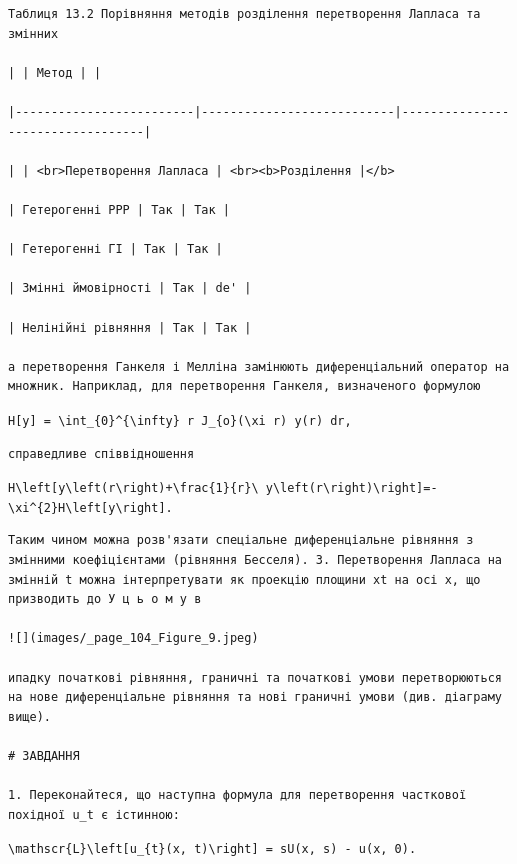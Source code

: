 \documentclass[
  ukrainian,
]{article}
\begin{document}
\begin{verbatim}
Таблиця 13.2 Порівняння методів розділення перетворення Лапласа та змінних

| | Метод | |

|-------------------------|---------------------------|----------------------------------|

| | <br>Перетворення Лапласа | <br><b>Розділення |</b>

| Гетерогенні PPP | Так | Так |

| Гетерогенні ГІ | Так | Так |

| Змінні ймовірності | Так | de' |

| Нелінійні рівняння | Так | Так |

а перетворення Ганкеля і Мелліна замінюють диференціальний оператор на множник. Наприклад, для перетворення Ганкеля, визначеного формулою
\end{verbatim}

\texttt{H{[}y{]}\ =\ \textbackslash{}int\_\{0\}\^{}\{\textbackslash{}infty\}\ r\ J\_\{o\}(\textbackslash{}xi\ r)\ y(r)\ dr,}

\begin{verbatim}
справедливе співвідношення
\end{verbatim}

\texttt{H\textbackslash{}left{[}y\textquotesingle{}\textquotesingle{}\textbackslash{}left(r\textbackslash{}right)+\textbackslash{}frac\{1\}\{r\}\textbackslash{}\ y\textquotesingle{}\textbackslash{}left(r\textbackslash{}right)\textbackslash{}right{]}=-\textbackslash{}xi\^{}\{2\}H\textbackslash{}left{[}y\textbackslash{}right{]}.}

\begin{verbatim}
Таким чином можна розв'язати спеціальне диференціальне рівняння з змінними коефіцієнтами (рівняння Бесселя). 3. Перетворення Лапласа на змінній t можна інтерпретувати як проекцію площини xt на осі x, що призводить до У ц ь о м у в

![](images/_page_104_Figure_9.jpeg)

ипадку початкові рівняння, граничні та початкові умови перетворюються на нове диференціальне рівняння та нові граничні умови (див. діаграму вище).

# ЗАВДАННЯ

1. Переконайтеся, що наступна формула для перетворення часткової похідної u_t є істинною:
\end{verbatim}

\texttt{\textbackslash{}mathscr\{L\}\textbackslash{}left{[}u\_\{t\}(x,\ t)\textbackslash{}right{]}\ =\ sU(x,\ s)\ -\ u(x,\ 0).}
\end{document}
